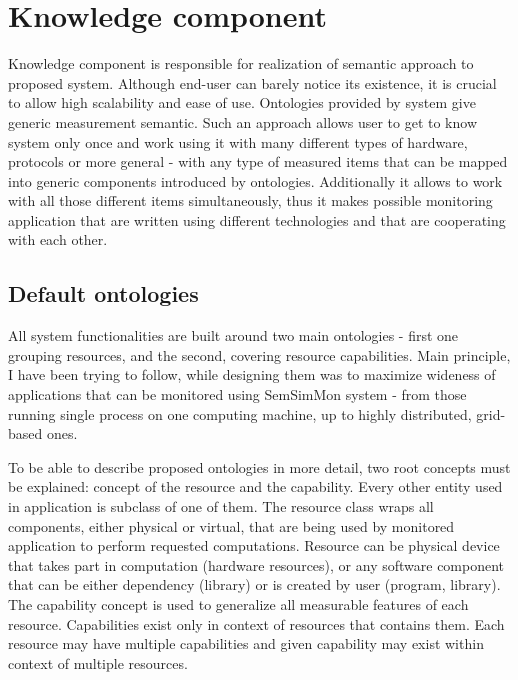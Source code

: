 %
\section{Knowledge component}
\label{sec:arch_knowledge}

Knowledge component is responsible for realization of semantic approach to proposed system. Although end-user can barely notice its existence, it is crucial to allow high scalability and ease of use. Ontologies provided by system give generic measurement semantic. Such an approach allows user to get to know system only once and work using it with many different types of hardware, protocols or more general - with any type of measured items that can be mapped into generic components introduced by ontologies. Additionally it allows to work with all those different items simultaneously, thus it makes possible monitoring application that are written using different technologies and that are cooperating with each other.

\subsection{Default ontologies}

All system functionalities are built around two main ontologies - first one grouping resources, and the second, covering resource capabilities. Main principle, I have been trying to follow, while designing them was to maximize wideness of applications that can be monitored using SemSimMon system - from those running single process on one computing machine, up to highly distributed, grid-based ones.

To be able to describe proposed ontologies in more detail, two root concepts must be explained: concept of the resource and the capability. Every other entity used in application is subclass of one of them. The resource class wraps all components, either physical or virtual, that are being used by monitored application to perform requested computations. Resource can be physical device that takes part in computation (hardware resources), or any software component that can be either dependency (library) or is created by user (program, library). The capability concept is used to generalize all measurable features of each resource. Capabilities exist only in context of resources that contains them. Each resource may have multiple capabilities and given capability may exist within context of multiple resources.

